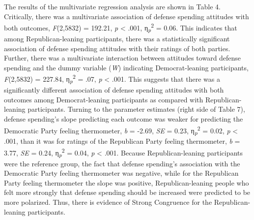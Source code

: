 \documentclass[authordate, meta]{jote-new-article}
\begin{document}
	The results of the multivariate regression analysis are shown in Table 4. Critically, there was a multivariate association of defense spending attitudes with both outcomes, \emph{F}(2,5832) = 192.21, \emph{p }< .001, η\textsubscript{\emph{p}}\textsuperscript{2} = 0.06. This indicates that among Republican-leaning participants, there was a statistically significant association of defense spending attitudes with their ratings of both parties. Further, there was a multivariate interaction between attitudes toward defense spending and the dummy variable (\emph{W}) indicating Democrat-leaning participants, \emph{F}(2,5832) = 227.84, η\textsubscript{\emph{p}}\textsuperscript{2} = .07, \emph{p }< .001. This suggests that there was a significantly different association of defense spending attitudes with both outcomes among Democrat-leaning participants as compared with Republican-leaning participants. Turning to the parameter estimates (right side of Table 7), defense spending's slope predicting each outcome was weaker for predicting the Democratic Party feeling thermometer, \emph{b }= -2.69, \emph{SE }= 0.23, η\textsubscript{\emph{p}}\textsuperscript{2} = 0.02, \emph{p }< .001, than it was for ratings of the Republican Party feeling thermometer, \emph{b }= 3.77, \emph{SE }= 0.24, η\textsubscript{\emph{p}}\textsuperscript{2} = 0.04, \emph{p }< .001. Because Republican-leaning participants were the reference group, the fact that defense spending's association with the Democratic Party feeling thermometer was negative, while for the Republican Party feeling thermometer the slope was positive, Republican-leaning people who felt more strongly that defense spending should be increased were predicted to be more polarized. Thus, there is evidence of Strong Congruence for the Republican-leaning participants.
\end{document}
